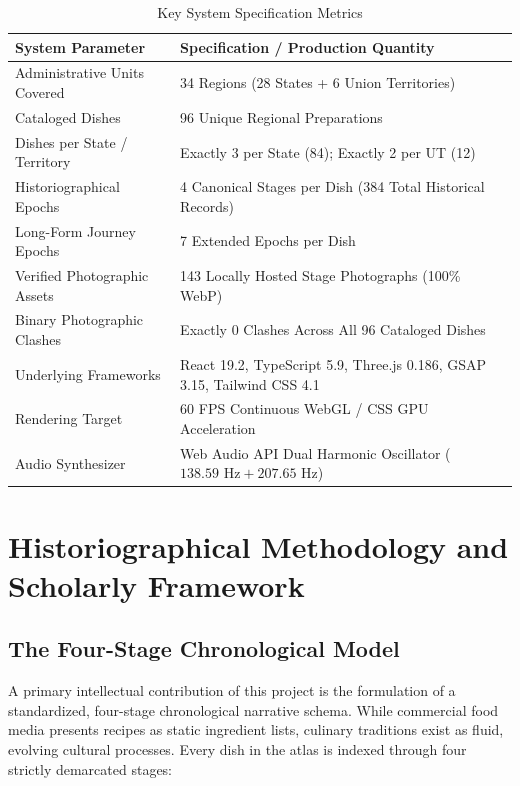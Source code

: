 \documentclass[11pt,a4paper]{report}
\begin{document}
\begin{table}[ht]
    \centering
    \caption{Key System Specification Metrics}
    \label{tab:system_metrics}
    \begin{tabularx}{\textwidth}{lX}
        \toprule
        \textbf{System Parameter} & \textbf{Specification / Production Quantity} \\
        \midrule
        Administrative Units Covered & 34 Regions (28 States + 6 Union Territories) \\
        Cataloged Dishes & 96 Unique Regional Preparations \\
        Dishes per State / Territory & Exactly 3 per State (84); Exactly 2 per UT (12) \\
        Historiographical Epochs & 4 Canonical Stages per Dish (384 Total Historical Records) \\
        Long-Form Journey Epochs & 7 Extended Epochs per Dish \\
        Verified Photographic Assets & 143 Locally Hosted Stage Photographs (100\% WebP) \\
        Binary Photographic Clashes & Exactly 0 Clashes Across All 96 Cataloged Dishes \\
        Underlying Frameworks & React 19.2, TypeScript 5.9, Three.js 0.186, GSAP 3.15, Tailwind CSS 4.1 \\
        Rendering Target & 60 FPS Continuous WebGL / CSS GPU Acceleration \\
        Audio Synthesizer & Web Audio API Dual Harmonic Oscillator ($138.59\text{ Hz} + 207.65\text{ Hz}$) \\
        \bottomrule
    \end{tabularx}
\end{table}

\chapter{Historiographical Methodology and Scholarly Framework}

\section{The Four-Stage Chronological Model}
A primary intellectual contribution of this project is the formulation of a standardized, four-stage chronological narrative schema. While commercial food media presents recipes as static ingredient lists, culinary traditions exist as fluid, evolving cultural processes. Every dish in the atlas is indexed through four strictly demarcated stages:
\end{document}
